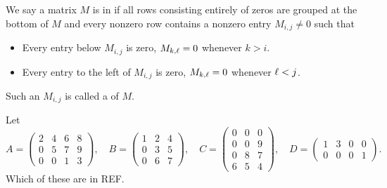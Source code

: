 \documentclass{ximera}
\begin{document}
\begin{definition}
  We say a matrix $M$ is in  if all rows
  consisting entirely of zeros are grouped at the bottom of $M$ and
  every nonzero row contains a nonzero entry $M_{i,j}\ne 0$ such that
  \begin{itemize}
  \item Every entry below $M_{i,j}$ is zero, $M_{k,\ell}=0$ whenever $k> i$.
  \item Every entry to the left of $M_{i,j}$ is zero, $M_{k,\ell}=0$ whenever $\ell < j$.
  \end{itemize}
  Such an $M_{i,j}$ is called a  of $M$.
\end{definition}

\begin{question}
  Let
  \[
    A =
    \begin{pmatrix}
      2 & 4 & 6 & 8 \\
      0 & 5 & 7 & 9 \\
      0 & 0 & 1 & 3
    \end{pmatrix}, \quad
    B =
    \begin{pmatrix}
      1 & 2 & 4 \\
      0 & 3 & 5 \\
      0 & 6 & 7
    \end{pmatrix}, \quad
    C =
    \begin{pmatrix}
      0 & 0 & 0 \\
      0 & 0 & 9 \\
      0 & 8 & 7 \\
      6 & 5 & 4
    \end{pmatrix}, \quad
    D =
    \begin{pmatrix}
      1 & 3 & 0 & 0 \\
      0 & 0 & 0 & 1
    \end{pmatrix}.
  \]
  Which of these are in REF.
  \begin{prompt}
  \begin{selectAll}
  \end{selectAll}
\end{prompt}
\end{question}
\end{document}
